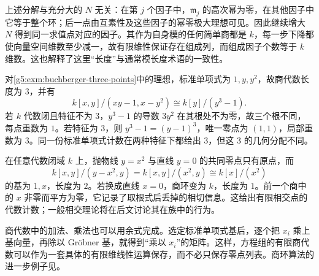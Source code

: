 上述分解与充分大的 \(N\) 无关：在第 \(j\) 个因子中，\(\mathfrak m_j\) 的高次幂为零，在其他因子中它等于整个环；后一点由互素性及这些因子的幂零极大理想可见。因此继续增大 \(N\) 得到同一求值点对应的因子。其作为自身模的任何简单商都是 \(k\)，每一步下降都使向量空间维数至少减一，故有限维性保证存在组成列，而组成因子个数等于 \(k\) 维数。这也解释了这里“长度”与通常模长度术语的一致性。

\begin{example}\label{g5:exm:length-three-points}
	对\cref{g5:exm:buchberger-three-points}中的理想，标准单项式为 \(1,y,y^2\)，故商代数长度为 \(3\)，并有
	\[
		k[x,y]/(xy-1,x-y^2)\cong k[y]/(y^3-1).
	\]
	若 \(k\) 代数闭且特征不为 \(3\)，\(y^3-1\) 的导数 \(3y^2\) 在其根处不为零，故三个根不同，每点重数为 \(1\)。若特征为 \(3\)，则 \(y^3-1=(y-1)^3\)，唯一零点为 \((1,1)\)，局部重数为 \(3\)。同一份标准单项式计数在两种特征下都给出 \(3\)，但这 \(3\) 的几何分配不同。
\end{example}

\begin{example}\label{g5:exm:tangent-intersection-length}
	在任意代数闭域 \(k\) 上，抛物线 \(y=x^2\) 与直线 \(y=0\) 的共同零点只有原点，而
	\[
		k[x,y]/(y-x^2,y)=k[x,y]/(x^2,y)\cong k[x]/(x^2)
	\]
	的基为 \(1,x\)，长度为 \(2\)。若换成直线 \(x=0\)，商环变为 \(k\)，长度为 \(1\)。前一个商中的 \(x\) 非零而平方为零，它记录了取根式后丢掉的相切信息。这给出有限相交点的代数计数；一般相交理论将在后文讨论其在族中的行为。
\end{example}

商代数中的加法、乘法也可以用余式完成。选定标准单项式基后，逐个把 \(x_i\) 乘上基向量，再除以 Gröbner 基，就得到“乘以 \(x_i\)”的矩阵。这样，方程组的有限商代数可以作为一套具体的有限维线性运算保存，而不必只保存零点列表。商环算法的进一步例子见\cite[第5章第3节]{CoxLittleOShea2015}。
